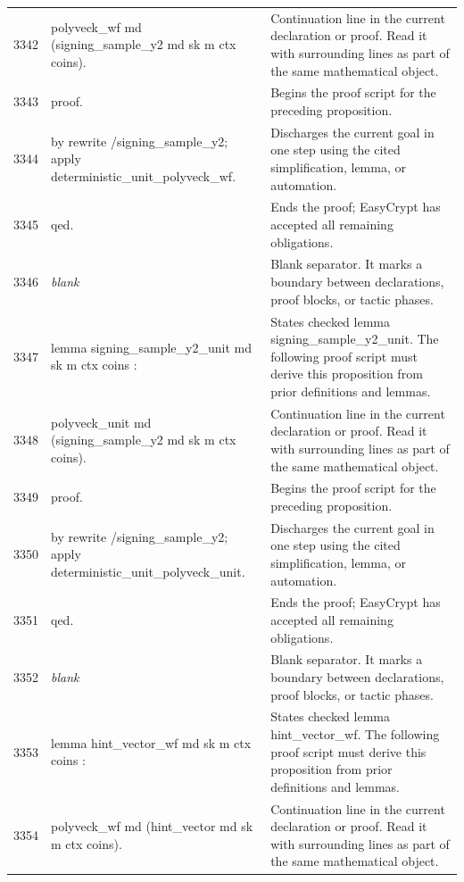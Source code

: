 \documentclass[10pt]{article}
\begin{document}
\begin{longtable}{r L{0.53\textwidth} L{0.37\textwidth}}
3342 & {\ttfamily\scriptsize   polyveck\_wf md (signing\_sample\_y2 md sk m ctx coins).} & Continuation line in the current declaration or proof.  Read it with surrounding lines as part of the same mathematical object. \\
3343 & {\ttfamily\scriptsize proof.} & Begins the proof script for the preceding proposition. \\
3344 & {\ttfamily\scriptsize by rewrite /signing\_sample\_y2; apply deterministic\_unit\_polyveck\_wf.} & Discharges the current goal in one step using the cited simplification, lemma, or automation. \\
3345 & {\ttfamily\scriptsize qed.} & Ends the proof; EasyCrypt has accepted all remaining obligations. \\
3346 & {\ttfamily\scriptsize \emph{blank}} & Blank separator.  It marks a boundary between declarations, proof blocks, or tactic phases. \\
3347 & {\ttfamily\scriptsize lemma signing\_sample\_y2\_unit md sk m ctx coins :} & States checked lemma signing\_sample\_y2\_unit.  The following proof script must derive this proposition from prior definitions and lemmas. \\
3348 & {\ttfamily\scriptsize   polyveck\_unit md (signing\_sample\_y2 md sk m ctx coins).} & Continuation line in the current declaration or proof.  Read it with surrounding lines as part of the same mathematical object. \\
3349 & {\ttfamily\scriptsize proof.} & Begins the proof script for the preceding proposition. \\
3350 & {\ttfamily\scriptsize by rewrite /signing\_sample\_y2; apply deterministic\_unit\_polyveck\_unit.} & Discharges the current goal in one step using the cited simplification, lemma, or automation. \\
3351 & {\ttfamily\scriptsize qed.} & Ends the proof; EasyCrypt has accepted all remaining obligations. \\
3352 & {\ttfamily\scriptsize \emph{blank}} & Blank separator.  It marks a boundary between declarations, proof blocks, or tactic phases. \\
3353 & {\ttfamily\scriptsize lemma hint\_vector\_wf md sk m ctx coins :} & States checked lemma hint\_vector\_wf.  The following proof script must derive this proposition from prior definitions and lemmas. \\
3354 & {\ttfamily\scriptsize   polyveck\_wf md (hint\_vector md sk m ctx coins).} & Continuation line in the current declaration or proof.  Read it with surrounding lines as part of the same mathematical object. \\

\end{longtable}
\end{document}
